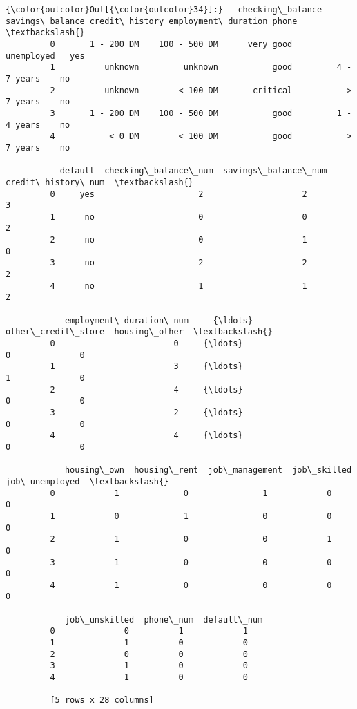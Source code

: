 \documentclass[11pt]{article}
\begin{document}
\begin{Verbatim}[commandchars=\\\{\}]
{\color{outcolor}Out[{\color{outcolor}34}]:}   checking\_balance savings\_balance credit\_history employment\_duration phone  \textbackslash{}
         0       1 - 200 DM    100 - 500 DM      very good          unemployed   yes   
         1          unknown         unknown           good         4 - 7 years    no   
         2          unknown        < 100 DM       critical           > 7 years    no   
         3       1 - 200 DM    100 - 500 DM           good         1 - 4 years    no   
         4           < 0 DM        < 100 DM           good           > 7 years    no   
         
           default  checking\_balance\_num  savings\_balance\_num  credit\_history\_num  \textbackslash{}
         0     yes                     2                    2                   3   
         1      no                     0                    0                   2   
         2      no                     0                    1                   0   
         3      no                     2                    2                   2   
         4      no                     1                    1                   2   
         
            employment\_duration\_num     {\ldots}       other\_credit\_store  housing\_other  \textbackslash{}
         0                        0     {\ldots}                        0              0   
         1                        3     {\ldots}                        1              0   
         2                        4     {\ldots}                        0              0   
         3                        2     {\ldots}                        0              0   
         4                        4     {\ldots}                        0              0   
         
            housing\_own  housing\_rent  job\_management  job\_skilled  job\_unemployed  \textbackslash{}
         0            1             0               1            0               0   
         1            0             1               0            0               0   
         2            1             0               0            1               0   
         3            1             0               0            0               0   
         4            1             0               0            0               0   
         
            job\_unskilled  phone\_num  default\_num  
         0              0          1            1  
         1              1          0            0  
         2              0          0            0  
         3              1          0            0  
         4              1          0            0  
         
         [5 rows x 28 columns]
\end{Verbatim}
            
\end{document}
